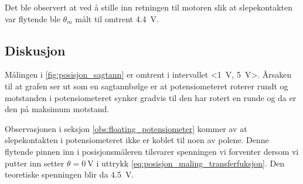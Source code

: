 \label{obs:floating_potensiometer}
Det ble observert at ved å stille inn retningen til motoren slik at slepekontakten var flytende ble $\theta_m$ målt til omtrent \SI{4.4}{\volt}.








\subsection{Diskusjon}

Målingen i \autoref{fig:posisjon_sagtann} er omtrent i intervallet <\SI{1}{\volt}, \SI{5}{\volt}>. Årsaken til at grafen ser ut som en sagtannbølge er at potensiometeret roterer rundt og motstanden i potensiometeret synker gradvis til den har rotert en runde og da er den på maksimum motstand.


Observasjonen i seksjon \ref{obs:floating_potensiometer} kommer av at slepekontakten i potensiometeret ikke er koblet til noen av polene. Denne flytende pinnen inn i posisjonsmåleren tilsvarer spenningen vi forventer dersom vi putter inn setter $\theta = \SI{0}{\volt}$ i uttrykk \eqref{eq:posisjon_maling_transferfuksjon}. Den teoretiske spenningen blir da \SI{4.5}{\volt}.
